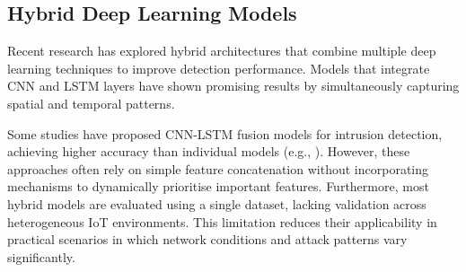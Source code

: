 \documentclass[a4paper,fleqn]{cas-sc}
\begin{document}
\subsection{Hybrid Deep Learning Models}

Recent research has explored hybrid architectures that combine multiple deep learning techniques to improve detection performance. Models that integrate CNN and LSTM layers have shown promising results by simultaneously capturing spatial and temporal patterns.

Some studies have proposed CNN-LSTM fusion models for intrusion detection, achieving higher accuracy than individual models (e.g., \citep{yan2023deep}). However, these approaches often rely on simple feature concatenation without incorporating mechanisms to dynamically prioritise important features. Furthermore, most hybrid models are evaluated using a single dataset, lacking validation across heterogeneous IoT environments. This limitation reduces their applicability in practical scenarios in which network conditions and attack patterns vary significantly.
\end{document}
